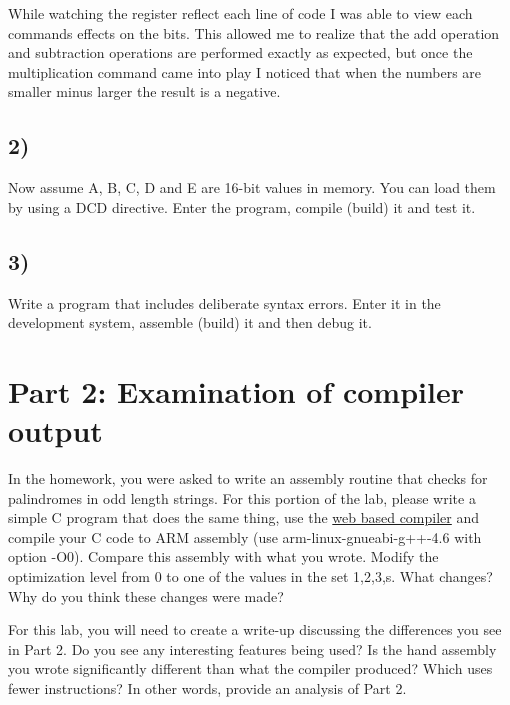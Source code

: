 \documentclass[letterpaper,12pt,titlepage]{article}
\begin{document}

While watching the register reflect each line of code I was able to view each commands effects on the bits. This allowed me to realize that the add operation and subtraction operations are performed exactly as expected, but once the multiplication command came into play I noticed that when the numbers are smaller minus larger the result is a negative. 

 \newpage
\subsection*{2)} Now assume A, B, C, D and E are 16-bit values in memory. You can load them by using a DCD directive. Enter the program, compile (build) it and test it.
 


\newpage
\subsection*{3)} Write a program that includes deliberate syntax errors.   Enter it in the development system, assemble (build) it and
then debug it. 



\newpage
\section*{Part 2: Examination of compiler output}
In the homework, you were asked to write an assembly routine that checks for palindromes in odd length strings. For this portion of the lab, please write a simple C program that does the same thing, use the \href{http://gcc.godbolt.org}{web based compiler} and compile your  C code to ARM assembly (use arm-linux-gnueabi-g++-4.6 with option -O0). Compare this assembly with what you wrote. Modify the optimization level from 0 to one of the values in the set {1,2,3,s}. What changes? Why do you think these changes were made?

For this lab, you will need to create a write-up discussing the differences you see in Part 2. Do you see any interesting features being used? Is the hand assembly you wrote significantly different than what the compiler produced? Which uses fewer instructions? In other words, provide an analysis of Part 2.

%
\end{document}
